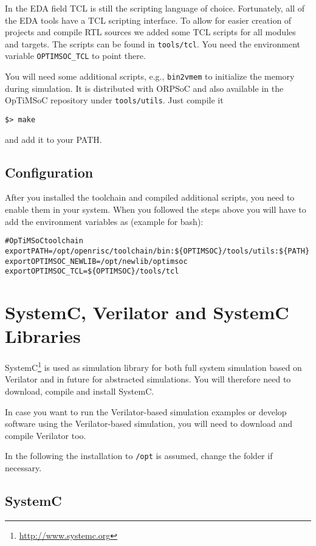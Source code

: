 In the EDA field TCL is still the scripting language of choice.
Fortunately, all of the EDA tools have a TCL scripting interface. To
allow for easier creation of projects and compile RTL sources we added
some TCL scripts for all modules and targets. The scripts can be found
in \verb|tools/tcl|. You need the environment variable
\verb|OPTIMSOC_TCL| to point there.

You will need some additional scripts, e.g., \verb|bin2vmem| to
initialize the memory during simulation. It is distributed with ORPSoC
and also available in the OpTiMSoC repository under
\verb|tools/utils|. Just compile it

\begin{verbatim}
$> make
\end{verbatim}

and add it to your PATH.

\subsection{Configuration}

After you installed the toolchain and compiled additional scripts, you
need to enable them in your system. When you followed the steps above
you will have to add the environment variables as (example for bash):

\begin{alltt}
# OpTiMSoC toolchain
export PATH=/opt/openrisc/toolchain/bin:\$\{OPTIMSOC\}/tools/utils:\$\{PATH\}
export OPTIMSOC_NEWLIB=/opt/newlib/optimsoc
export OPTIMSOC_TCL=\$\{OPTIMSOC\}/tools/tcl
\end{alltt}

\section{SystemC, Verilator and SystemC Libraries}

SystemC\footnote{\url{http://www.systemc.org}} is used as simulation
library for both full system simulation based on Verilator and in
future for abstracted simulations. You will therefore need to
download, compile and install SystemC.

In case you want to run the Verilator-based simulation examples or
develop software using the Verilator-based simulation, you will need
to download and compile Verilator too.

In the following the installation to \verb|/opt| is assumed, change
the folder if necessary.

\subsection{SystemC}

